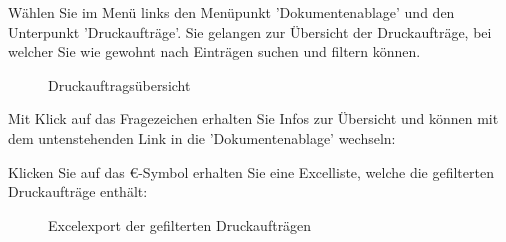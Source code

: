 Wählen Sie im Menü links den Menüpunkt 'Dokumentenablage' und den Unterpunkt 'Druckaufträge'. Sie gelangen zur Übersicht der Druckaufträge, bei welcher Sie wie gewohnt nach Einträgen suchen und filtern können.

\vspace{4cm} 

\begin{figure}[H]
\caption{Druckauftragsübersicht}
\end{figure}

Mit Klick auf das Fragezeichen  erhalten Sie Infos zur Übersicht und können mit dem untenstehenden Link in die 'Dokumentenablage' wechseln:

\begin{figure}[H]
\end{figure}

Klicken Sie auf das \euro{-Symbol}  erhalten Sie eine Excelliste, welche die gefilterten Druckaufträge enthält:

\begin{figure}[H]
\caption{Excelexport der gefilterten Druckaufträgen}
\end{figure}

